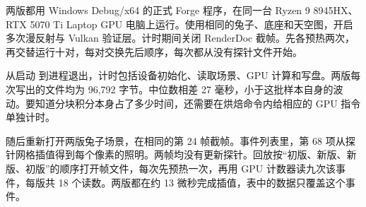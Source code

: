 两版都用 Windows Debug/x64 的正式 Forge 程序，在同一台 Ryzen 9 8945HX、RTX 5070 Ti Laptop GPU 电脑上运行。使用相同的兔子、底座和天空图，开启多次漫反射与 Vulkan 验证层。计时期间关闭 RenderDoc 截帧。先各预热两次，再交替运行十对，每对交换先后顺序，每次都从没有探针文件开始。

从启动  到进程退出，计时包括设备初始化、读取场景、GPU 计算和写盘。两版每次写出的文件均为 96,792 字节。中位数相差 27 毫秒，小于这批样本自身的波动。要知道分块积分本身占了多少时间，还需要在烘焙命令内给相应的 GPU 指令单独计时。

随后重新打开两版兔子场景，在相同的第 24 帧截帧。事件列表里，第 68 项从探针网格插值得到每个像素的照明。两帧均没有更新探针。回放按“初版、新版、新版、初版”的顺序打开帧文件，每次先预热一次，再用 GPU 计数器读九次该事件，每版共 18 个读数。两版都在约 13 微秒完成插值，表中的数据只覆盖这个事件。

